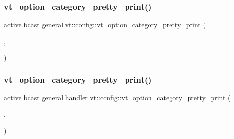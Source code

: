 \subsubsection{\texorpdfstring{vt\+\_\+option\+\_\+category\+\_\+pretty\+\_\+print()}{vt\_option\_category\_pretty\_print()}\hspace{0.1cm}{\footnotesize\ttfamily [4/16]}}
{\footnotesize\ttfamily \hyperlink{namespacevt_1_1config_a6bd1d6215bda0d8ca02811798399f689a82f77c67af0c363709010c6df4dbd920}{active} bcast general vt\+::config\+::vt\+\_\+option\+\_\+category\+\_\+pretty\+\_\+print (\begin{DoxyParamCaption}\item[{\hyperlink{namespacevt_1_1config_a6bd1d6215bda0d8ca02811798399f689a132506d2b8e888d0a91ae4470d4197c1}{group}}]{,  }\item[{\char`\"{}group\char`\"{}}]{ }\end{DoxyParamCaption})}

\mbox{\label{namespacevt_1_1config_abec888224b94cd54b72b109b3af171e7}} 
\subsubsection{\texorpdfstring{vt\+\_\+option\+\_\+category\+\_\+pretty\+\_\+print()}{vt\_option\_category\_pretty\_print()}\hspace{0.1cm}{\footnotesize\ttfamily [5/16]}}
{\footnotesize\ttfamily \hyperlink{namespacevt_1_1config_a6bd1d6215bda0d8ca02811798399f689a82f77c67af0c363709010c6df4dbd920}{active} bcast general \hyperlink{namespacevt_1_1config_a6bd1d6215bda0d8ca02811798399f689a82a0081a94d5c5dfd18b0b3f7eca64b7}{handler} vt\+::config\+::vt\+\_\+option\+\_\+category\+\_\+pretty\+\_\+print (\begin{DoxyParamCaption}\item[{\hyperlink{namespacevt_1_1config_a6bd1d6215bda0d8ca02811798399f689a130f5ad6dc3e35d09be7ee3581b07175}{hierlb}}]{,  }\item[{\char`\"{}Hierarchical\+LB\char`\"{}}]{ }\end{DoxyParamCaption})}

\mbox{\label{namespacevt_1_1config_a608d5922ee8eb1103a14e84fd48f3f4e}} 
